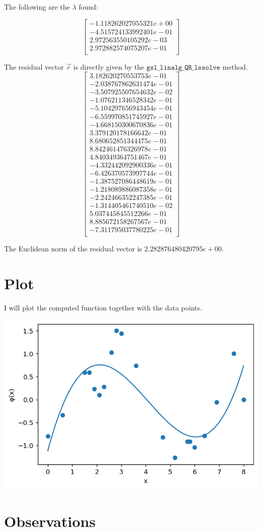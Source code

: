 \documentclass{article}
\newcommand{\code}{\texttt}
\begin{document}
The following are the $\lambda$ found:

$$
\begin{bmatrix}
-1.118262027055321e+00\\
-4.515724133992401e-01\\
2.972563550105292e-03\\
2.972882574075207e-01\\
\end{bmatrix}
$$

The residual vector $\vec{r}$ is directly given by the $\code{gsl\_linalg\_QR\_lssolve}$ method.
$$
\begin{bmatrix}
3.182620270553753e-01\\
-2.038767862631474e-01\\
-3.507925507654632e-02\\
-1.076211346528342e-01\\
-5.104297656943454e-01\\
-6.559970851745927e-01\\
-4.668150300670836e-01\\
3.379120178166642e-01\\
8.680652851344475e-01\\
8.842461476326978e-01\\
4.840349364751467e-01\\
-4.332442092900336e-01\\
-6.426370573997744e-01\\
-1.387527086448619e-01\\
-1.218089886087358e-01\\
-2.242466352247385e-01\\
-1.314405461740510e-02\\
5.037445845512266e-01\\
8.885672158267567e-01\\
-7.311795037780225e-01\\
\end{bmatrix} 
$$

The Euclidean norm of the residual vector is $2.282876480420795e+00$.
\section{Plot}
I will plot the computed function together with the data points.

\includegraphics[width=\textwidth,height=\textheight,keepaspectratio]{graph.png}

\section{Observations}
\end{document}
